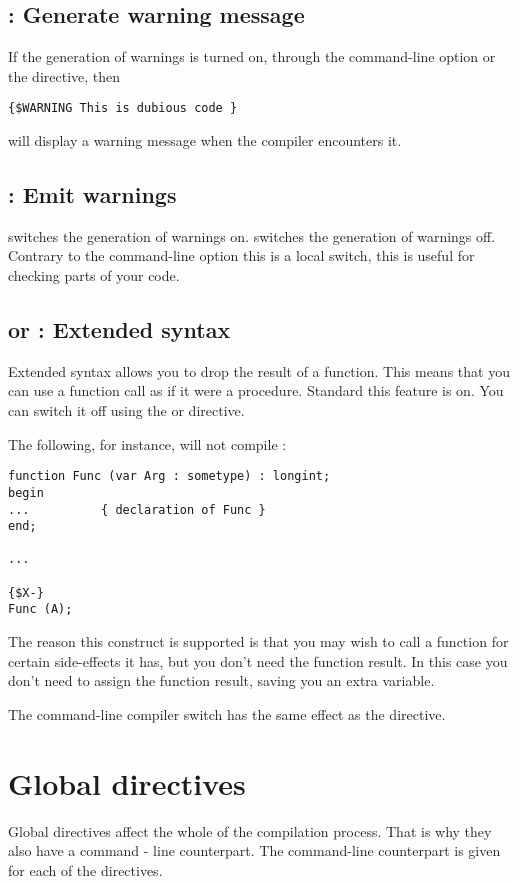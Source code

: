 \documentclass{report}
\begin{document}
\subsection{ : Generate warning message}

If the generation of warnings is turned on, through the  
command-line option or the  directive, then
\begin{verbatim}
{$WARNING This is dubious code }
\end{verbatim}
will display a warning message when the compiler encounters it.

\subsection{ : Emit warnings}

 switches the generation of warnings on. 
 switches the generation of warnings off. 
Contrary to the command-line option  this
is a local switch, this is useful for checking parts of your code.

\subsection{ or  : Extended syntax}
Extended syntax allows you to drop the result of a function. This means that
you can use a function call as if it were a procedure. Standard this feature
is on. You can switch it off using the  or
directive.

The following, for instance, will not compile :
\begin{verbatim}
function Func (var Arg : sometype) : longint;
begin
...          { declaration of Func }
end;

...

{$X-}
Func (A);
\end{verbatim}
The reason this construct is supported is that you may wish to call a
function for certain side-effects it has, but you don't need the function
result. In this case you don't need to assign the function result, saving
you an extra variable.

The command-line compiler switch  has the same effect as the
 directive.


\section{Global directives}
\label{se:GlobalSwitch}
Global directives affect the whole of the compilation process. That is why
they also have a command - line counterpart. The command-line counterpart is
given for each of the directives.
\end{document}
